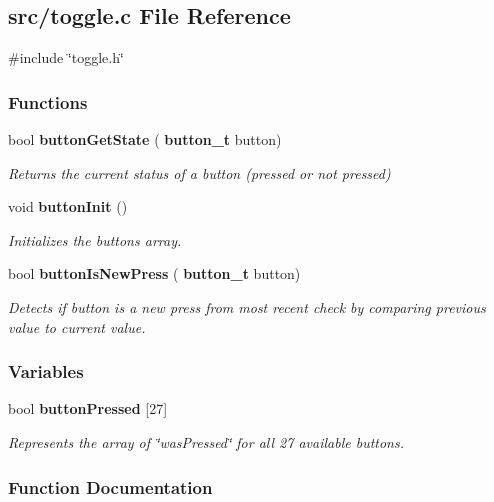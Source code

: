 \subsection{src/toggle.c File Reference}
\label{a00146}
{\ttfamily \#include \char`\"{}toggle.\+h\char`\"{}}\newline
\subsubsection*{Functions}
\begin{DoxyCompactItemize}
\item 
bool \textbf{ button\+Get\+State} (\textbf{ button\+\_\+t} button)
\begin{DoxyCompactList}\small\item\em Returns the current status of a button (pressed or not pressed) \end{DoxyCompactList}\item 
void \textbf{ button\+Init} ()
\begin{DoxyCompactList}\small\item\em Initializes the buttons array. \end{DoxyCompactList}\item 
bool \textbf{ button\+Is\+New\+Press} (\textbf{ button\+\_\+t} button)
\begin{DoxyCompactList}\small\item\em Detects if button is a new press from most recent check by comparing previous value to current value. \end{DoxyCompactList}\end{DoxyCompactItemize}
\subsubsection*{Variables}
\begin{DoxyCompactItemize}
\item 
bool \textbf{ button\+Pressed} [27]
\begin{DoxyCompactList}\small\item\em Represents the array of \char`\"{}was\+Pressed\char`\"{} for all 27 available buttons. \end{DoxyCompactList}\end{DoxyCompactItemize}


\subsubsection{Function Documentation}
\mbox{\label{a00146_ad2b7c969a01f85d57bdca0bc7f5cff81}} 
